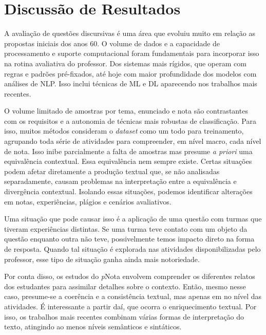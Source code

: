 \section{Discussão de Resultados}
\label{sec-discussao}

A avaliação de questões discursivas é uma área que evoluiu muito em relação as propostas iniciais dos anos 60. O volume de dados e a capacidade de processamento e suporte computacional foram fundamentais para incorporar isso na rotina avaliativa do professor. Dos sistemas mais rígidos, que operam com regras e padrões pré-fixados, até hoje com maior profundidade dos modelos com análises de NLP. Isso inclui técnicas de ML e DL aparecendo nos trabalhos mais recentes.


O volume limitado de amostras por tema, enunciado e nota são contrastantes com os requisitos e a autonomia de técnicas mais robustas de classificação. Para isso, muitos métodos consideram o \textit{dataset} como um todo para treinamento, agrupando toda série de atividades para compreender, em nível macro, cada nível de nota. Isso inibe parcialmente a falta de amostras mas presume \textit{a priori} uma equivalência contextual. Essa equivalência nem sempre existe. Certas situações podem afetar diretamente a produção textual que, se não analisadas separadamente, causam problemas na interpretação entre a equivalência e divergência contextual. Isolando essas situações, podemos identificar alterações em notas, experiências, plágios e cenários avaliativos. 

Uma situação que pode causar isso é a aplicação de uma questão com turmas que tiveram experiências distintas. Se uma turma teve contato com um objeto da questão enquanto outra não teve, possivelmente temos impacto direto na forma de resposta. Quando tal situação é explorada nas atividades disponibilizadas pelo professor, esse tipo de situação ganha ainda mais notoriedade.

Por conta disso, os estudos do \textit{p}Nota envolvem comprender os diferentes relatos dos estudantes para assimilar detalhes sobre o contexto. Então, mesmo nesse caso, presume-se a coerência e a consistência textual, mas apenas em no nível das atividades. É interessante a partir daí, que ocorra o enriquecimento textual. Por isso, os trabalhos mais recentes combinam várias formas de interpretação do texto, atingindo ao menos níveis semânticos e sintáticos.

